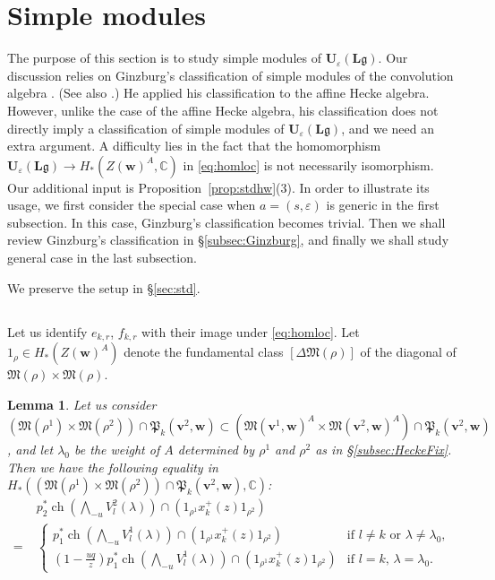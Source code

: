\documentclass[12pt]{amsart}
\def\Bbb{\mathbb}
\def\frak{\mathfrak}
\newcommand{\rom}{\textup}
\newtheorem{Lemma}[equation]{Lemma}
\theoremstyle{definition}
\theoremstyle{remark}
\numberwithin{equation}{subsection}
\newcommand{\secref}[1]{\S\ref{#1}}
\newcommand{\propref}[1]{Proposition~\ref{#1}}
\newcommand{\subsecref}[1]{\S\ref{#1}}
\newcommand{\C}{{\Bbb C}}
\newcommand{\M}{{\frak M}} %
\newcommand{\bv}{{\mathbf v}} %
\newcommand{\bw}{{\mathbf w}} %
\newcommand{\Ule}{{\mathbf U}_{\varepsilon}({\mathbf L}\mathfrak g)}
\newcommand{\Pa}{{\frak P}} %
\newcommand{\Wedge}{{\textstyle \bigwedge}}
\newcommand{\Zw}{Z(\bw)}
\begin{document}
\section{Simple modules}\label{sec:simple}

The purpose of this section is to study simple modules of $\Ule$. Our
discussion relies on Ginzburg's classification of simple modules of
the convolution algebra \cite[Chapter~9]{Gi-book}. (See also
\cite{Lu-cusp}.)
He applied his classification to the affine Hecke algebra.
%
However, unlike the case of the affine Hecke algebra, his
classification does not directly imply a classification of simple
modules of $\Ule$, and we need an extra argument. A difficulty lies in
the fact that the homomorphism $\Ule\to H_*(\Zw^A,\C)$ in
\eqref{eq:homloc} is not necessarily isomorphism. Our additional input
is \propref{prop:stdhw}(3). In order to illustrate its usage, we first
consider the special case when $a = (s,\varepsilon)$ is generic in the
first subsection. In this case, Ginzburg's classification becomes
trivial. Then we shall review Ginzburg's classification in
\subsecref{subsec:Ginzburg}, and finally we shall study general case
in the last subsection.

We preserve the setup in \secref{sec:std}.

\subsection{}\label{subsec:generic}
Let us identify $e_{k,r}$, $f_{k,r}$ with their image under
\eqref{eq:homloc}.
%
Let $1_\rho\in H_*(\Zw^A)$ denote the fundamental
class $[\Delta\M(\rho)]$ of the diagonal of $\M(\rho)\times\M(\rho)$.

\begin{Lemma}\label{lem:ETaut}
Let us consider
$(\M(\rho^1)\times\M(\rho^2))\cap \Pa_k(\bv^2,\bw)\subset
(\M(\bv^1,\bw)^A\times\M(\bv^2,\bw)^A)\cap\Pa_k(\bv^2,\bw)$,
and let $\lambda_0$ be the weight of $A$ determined by $\rho^1$ and
$\rho^2$ as in \subsecref{subsec:HeckeFix}.
Then we have the following equality in
$H_*((\M(\rho^1)\times\M(\rho^2))\cap \Pa_k(\bv^2,\bw),\C)$\rom:
\begin{equation*}
\begin{split}
   & p_2^* \operatorname{ch}\left(\Wedge_{-u} V^2_l(\lambda)\right)
     \cap (1_{\rho^1}x_k^+(z)1_{\rho^2})  \\
   = 
   \; &\begin{cases}
      p_1^*\operatorname{ch}\left(\Wedge_{-u} V^1_l(\lambda)\right)\cap
          (1_{\rho^1}x_k^+(z)1_{\rho^2}) & \text{if $l\neq k$ or 
                                 $\lambda \neq \lambda_0$}, \\
      (1-\frac{uq}z)p_1^*\operatorname{ch}\left(\Wedge_{-u}
          V^1_l(\lambda)\right)\cap (1_{\rho^1} x_k^+(z) 1_{\rho^2})
        & \text{if $l = k$, $\lambda = \lambda_0$}.
   \end{cases}
\end{split}
\end{equation*}
\end{Lemma}
\end{document}
